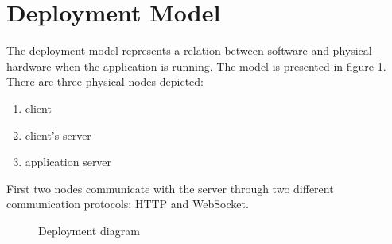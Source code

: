 \documentclass[thesis=B,english]{FITthesis}[2019/03/06]
\begin{document}
\section{Deployment Model}
The deployment model represents a relation between software and physical hardware when the application is running. 
The model is presented in figure \ref{fig:BP_DEPLOYMENT}. There are three physical nodes depicted: 
\begin{enumerate}
 \item client 
 \item client's server 
 \item application server
\end{enumerate}
First two nodes communicate with the server through two different communication protocols: HTTP and WebSocket.  
 \begin{figure}[h]
\centering 
{}
\caption{Deployment diagram} 
\label{fig:BP_DEPLOYMENT}  
\end{figure}  
\end{document}
